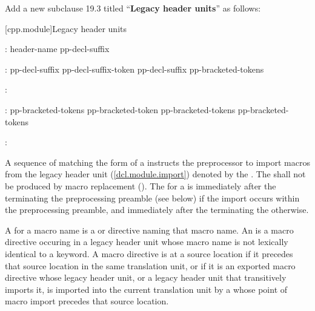 \begin{after}
\noindent
Add a new subclause 19.3 titled ``\textbf{Legacy header units}'' as follows:

\setcounter{section}{2}
[cpp.module]{Legacy header units}%
\resetalinea[0]

\begin{std.txt}
\color{addclr}
\begin{bnf}
:\br
  \opt{} \opt{} header-name pp-decl-suffix\opt{} \terminal{;}
\end{bnf}

\begin{bnf}
:\br
  pp-decl-suffix\opt{} pp-decl-suffix-token\br
  pp-decl-suffix\opt{} \terminal{[} pp-bracketed-tokens \terminal{]}
\end{bnf}

\begin{bnf}
:\br
\end{bnf}

\begin{bnf}
:\br
  pp-bracketed-tokens\opt{} pp-bracketed-token\br
  pp-bracketed-tokens\opt{} \terminal{[} pp-bracketed-tokens \terminal{]}
\end{bnf}

\begin{bnf}
:\br
\end{bnf}

\color{addclr}
\alinea
A sequence of  matching the form
of a 
instructs the preprocessor to import macros from the legacy header unit
(\ref{dcl.module.import}) denoted by the .
The \tcode{;}  shall not be produced by
macro replacement ().
The  for a  is
immediately after the \tcode{;} terminating the preprocessing preamble
(see below) if the import occurs within the preprocessing preamble, and
immediately after the \tcode{;} terminating the 
otherwise.

\color{addclr}
\alinea
A  for a macro name is a  or
 directive naming that macro name.
An  is
a macro directive occuring in a legacy header unit
\color{addclr}
whose macro name is not lexically identical to a keyword.
A macro directive is  at a source location
if it precedes that source location in the same translation unit, or
if it is an exported macro directive whose legacy header unit,
or a legacy header unit that
\color{addclr}
transitively imports it,
is imported into the current translation unit by a 
whose point of macro import precedes that source location.


\end{std.txt}
\end{after}

